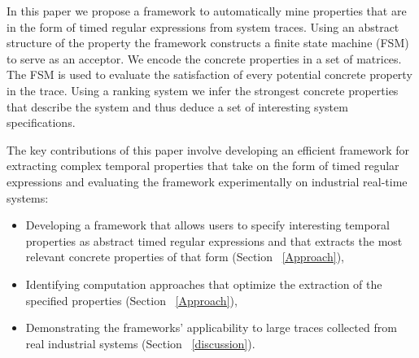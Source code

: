 \documentclass[]{sigplanconf}
\begin{document}


In this paper we propose a framework to automatically mine properties that are in the form of timed regular expressions from system traces. Using an abstract structure of the property the framework constructs a finite state machine (FSM) to serve as an acceptor. We encode the concrete properties in a set of matrices. The FSM is used to evaluate the satisfaction of every potential concrete property in the trace. Using a ranking system we infer the strongest concrete properties that describe the system and thus deduce a set of interesting system specifications.

The key contributions of this paper involve developing an efficient framework for extracting complex temporal properties that take on the form of timed regular expressions and evaluating the framework experimentally on industrial real-time systems:

\begin{itemize}
\item Developing a framework that allows users to specify interesting temporal properties as abstract timed regular expressions and that extracts the most relevant concrete properties of that form (Section ~\ref{Approach}),
\item Identifying computation approaches that optimize the extraction of the specified properties (Section ~\ref{Approach}),
\item Demonstrating the frameworks' applicability to large traces collected from real industrial systems  (Section ~\ref{discussion}).
\end{itemize}
\end{document}
